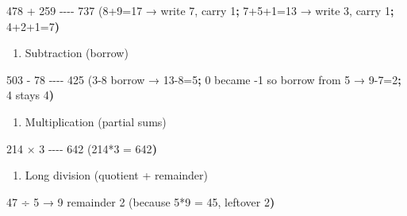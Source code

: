\documentclass[
  letterpaper,
  DIV=11,
  numbers=noendperiod]{scrreprt}
\newenvironment{Shaded}{\begin{snugshade}}{\end{snugshade}}
\newcommand{\AttributeTok}[1]{\textcolor[rgb]{0.40,0.45,0.13}{#1}}
\newcommand{\ErrorTok}[1]{\textcolor[rgb]{0.68,0.00,0.00}{#1}}
\newcommand{\ExtensionTok}[1]{\textcolor[rgb]{0.00,0.23,0.31}{#1}}
\newcommand{\KeywordTok}[1]{\textcolor[rgb]{0.00,0.23,0.31}{\textbf{#1}}}
\newcommand{\NormalTok}[1]{\textcolor[rgb]{0.00,0.23,0.31}{#1}}
\newcommand{\PreprocessorTok}[1]{\textcolor[rgb]{0.68,0.00,0.00}{#1}}
\providecommand{\tightlist}{%
  \setlength{\itemsep}{0pt}\setlength{\parskip}{0pt}}
\begin{document}
\begin{Shaded}
\begin{Highlighting}[]
   \ExtensionTok{478}
 \ExtensionTok{+}\NormalTok{ 259}
 \ExtensionTok{{-}{-}{-}{-}}
   \ExtensionTok{737}    \ErrorTok{(}\ExtensionTok{8+9=17}\NormalTok{ → write 7, carry 1}\KeywordTok{;} \ExtensionTok{7+5+1=13}\NormalTok{ → write 3, carry 1}\KeywordTok{;} \ExtensionTok{4+2+1=7}\KeywordTok{)}
\end{Highlighting}
\end{Shaded}

\begin{enumerate}
\def\labelenumi{\arabic{enumi}.}
\setcounter{enumi}{1}
\tightlist
\item
  Subtraction (borrow)
\end{enumerate}

\begin{Shaded}
\begin{Highlighting}[]
   \ExtensionTok{503}
 \ExtensionTok{{-}}\NormalTok{  78}
 \ExtensionTok{{-}{-}{-}{-}}
   \ExtensionTok{425}    \ErrorTok{(}\ExtensionTok{3{-}8}\NormalTok{ borrow → 13{-}8=5}\KeywordTok{;} \ExtensionTok{0}\NormalTok{ became }\AttributeTok{{-}1}\NormalTok{ so borrow from 5 → 9{-}7=2}\KeywordTok{;} \ExtensionTok{4}\NormalTok{ stays 4}\KeywordTok{)}
\end{Highlighting}
\end{Shaded}

\begin{enumerate}
\def\labelenumi{\arabic{enumi}.}
\setcounter{enumi}{2}
\tightlist
\item
  Multiplication (partial sums)
\end{enumerate}

\begin{Shaded}
\begin{Highlighting}[]
   \ExtensionTok{214}
 \ExtensionTok{×}\NormalTok{   3}
 \ExtensionTok{{-}{-}{-}{-}}
   \ExtensionTok{642}    \ErrorTok{(}\ExtensionTok{214*3}\NormalTok{ = 642}\KeywordTok{)}
\end{Highlighting}
\end{Shaded}

\begin{enumerate}
\def\labelenumi{\arabic{enumi}.}
\setcounter{enumi}{3}
\tightlist
\item
  Long division (quotient + remainder)
\end{enumerate}

\begin{Shaded}
\begin{Highlighting}[]
  \ExtensionTok{47}\NormalTok{ ÷ 5 → 9 remainder 2   }\ErrorTok{(}\ExtensionTok{because}\NormalTok{ 5}\PreprocessorTok{*}\NormalTok{9 = 45, leftover 2}\KeywordTok{)}
\end{Highlighting}
\end{Shaded}
\end{document}

